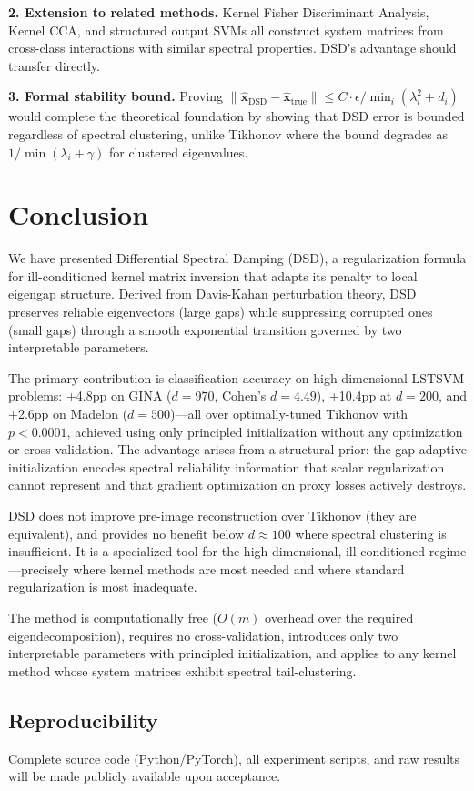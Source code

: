 \documentclass[preprint,review,12pt]{elsarticle}
\begin{document}
\textbf{2. Extension to related methods.} Kernel Fisher Discriminant Analysis, Kernel CCA, and structured output SVMs all construct system matrices from cross-class interactions with similar spectral properties. DSD's advantage should transfer directly.

\textbf{3. Formal stability bound.} Proving $\|\hat{\bm{x}}_{\text{DSD}} - \hat{\bm{x}}_{\text{true}}\| \leq C \cdot \epsilon / \min_i(\lambda_i^2 + d_i)$ would complete the theoretical foundation by showing that DSD error is bounded regardless of spectral clustering, unlike Tikhonov where the bound degrades as $1/\min(\lambda_i + \gamma)$ for clustered eigenvalues.


\section{Conclusion}
\label{sec:conclusion}

We have presented Differential Spectral Damping (DSD), a regularization formula for ill-conditioned kernel matrix inversion that adapts its penalty to local eigengap structure. Derived from Davis-Kahan perturbation theory, DSD preserves reliable eigenvectors (large gaps) while suppressing corrupted ones (small gaps) through a smooth exponential transition governed by two interpretable parameters.

The primary contribution is classification accuracy on high-dimensional LSTSVM problems: +4.8pp on GINA ($d{=}970$, Cohen's $d = 4.49$), +10.4pp at $d{=}200$, and +2.6pp on Madelon ($d{=}500$)---all over optimally-tuned Tikhonov with $p < 0.0001$, achieved using only principled initialization without any optimization or cross-validation. The advantage arises from a structural prior: the gap-adaptive initialization encodes spectral reliability information that scalar regularization cannot represent and that gradient optimization on proxy losses actively destroys.

DSD does not improve pre-image reconstruction over Tikhonov (they are equivalent), and provides no benefit below $d \approx 100$ where spectral clustering is insufficient. It is a specialized tool for the high-dimensional, ill-conditioned regime---precisely where kernel methods are most needed and where standard regularization is most inadequate.

The method is computationally free ($O(m)$ overhead over the required eigendecomposition), requires no cross-validation, introduces only two interpretable parameters with principled initialization, and applies to any kernel method whose system matrices exhibit spectral tail-clustering.

\subsection*{Reproducibility}
Complete source code (Python/PyTorch), all experiment scripts, and raw results will be made publicly available upon acceptance.



\end{document}
